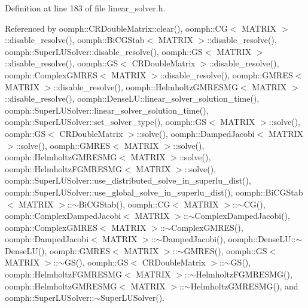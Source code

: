 Definition at line 183 of file linear\+\_\+solver.\+h.



Referenced by oomph\+::\+C\+R\+Double\+Matrix\+::clear(), oomph\+::\+C\+G$<$ M\+A\+T\+R\+I\+X $>$\+::disable\+\_\+resolve(), oomph\+::\+Bi\+C\+G\+Stab$<$ M\+A\+T\+R\+I\+X $>$\+::disable\+\_\+resolve(), oomph\+::\+Super\+L\+U\+Solver\+::disable\+\_\+resolve(), oomph\+::\+G\+S$<$ M\+A\+T\+R\+I\+X $>$\+::disable\+\_\+resolve(), oomph\+::\+G\+S$<$ C\+R\+Double\+Matrix $>$\+::disable\+\_\+resolve(), oomph\+::\+Complex\+G\+M\+R\+E\+S$<$ M\+A\+T\+R\+I\+X $>$\+::disable\+\_\+resolve(), oomph\+::\+G\+M\+R\+E\+S$<$ M\+A\+T\+R\+I\+X $>$\+::disable\+\_\+resolve(), oomph\+::\+Helmholtz\+G\+M\+R\+E\+S\+M\+G$<$ M\+A\+T\+R\+I\+X $>$\+::disable\+\_\+resolve(), oomph\+::\+Dense\+L\+U\+::linear\+\_\+solver\+\_\+solution\+\_\+time(), oomph\+::\+Super\+L\+U\+Solver\+::linear\+\_\+solver\+\_\+solution\+\_\+time(), oomph\+::\+Super\+L\+U\+Solver\+::set\+\_\+solver\+\_\+type(), oomph\+::\+G\+S$<$ M\+A\+T\+R\+I\+X $>$\+::solve(), oomph\+::\+G\+S$<$ C\+R\+Double\+Matrix $>$\+::solve(), oomph\+::\+Damped\+Jacobi$<$ M\+A\+T\+R\+I\+X $>$\+::solve(), oomph\+::\+G\+M\+R\+E\+S$<$ M\+A\+T\+R\+I\+X $>$\+::solve(), oomph\+::\+Helmholtz\+G\+M\+R\+E\+S\+M\+G$<$ M\+A\+T\+R\+I\+X $>$\+::solve(), oomph\+::\+Helmholtz\+F\+G\+M\+R\+E\+S\+M\+G$<$ M\+A\+T\+R\+I\+X $>$\+::solve(), oomph\+::\+Super\+L\+U\+Solver\+::use\+\_\+distributed\+\_\+solve\+\_\+in\+\_\+superlu\+\_\+dist(), oomph\+::\+Super\+L\+U\+Solver\+::use\+\_\+global\+\_\+solve\+\_\+in\+\_\+superlu\+\_\+dist(), oomph\+::\+Bi\+C\+G\+Stab$<$ M\+A\+T\+R\+I\+X $>$\+::$\sim$\+Bi\+C\+G\+Stab(), oomph\+::\+C\+G$<$ M\+A\+T\+R\+I\+X $>$\+::$\sim$\+C\+G(), oomph\+::\+Complex\+Damped\+Jacobi$<$ M\+A\+T\+R\+I\+X $>$\+::$\sim$\+Complex\+Damped\+Jacobi(), oomph\+::\+Complex\+G\+M\+R\+E\+S$<$ M\+A\+T\+R\+I\+X $>$\+::$\sim$\+Complex\+G\+M\+R\+E\+S(), oomph\+::\+Damped\+Jacobi$<$ M\+A\+T\+R\+I\+X $>$\+::$\sim$\+Damped\+Jacobi(), oomph\+::\+Dense\+L\+U\+::$\sim$\+Dense\+L\+U(), oomph\+::\+G\+M\+R\+E\+S$<$ M\+A\+T\+R\+I\+X $>$\+::$\sim$\+G\+M\+R\+E\+S(), oomph\+::\+G\+S$<$ M\+A\+T\+R\+I\+X $>$\+::$\sim$\+G\+S(), oomph\+::\+G\+S$<$ C\+R\+Double\+Matrix $>$\+::$\sim$\+G\+S(), oomph\+::\+Helmholtz\+F\+G\+M\+R\+E\+S\+M\+G$<$ M\+A\+T\+R\+I\+X $>$\+::$\sim$\+Helmholtz\+F\+G\+M\+R\+E\+S\+M\+G(), oomph\+::\+Helmholtz\+G\+M\+R\+E\+S\+M\+G$<$ M\+A\+T\+R\+I\+X $>$\+::$\sim$\+Helmholtz\+G\+M\+R\+E\+S\+M\+G(), and oomph\+::\+Super\+L\+U\+Solver\+::$\sim$\+Super\+L\+U\+Solver().

\mbox{\label{classoomph_1_1LinearSolver_a8bc045e20074cb9b45ab3f304d037fc6}} 
